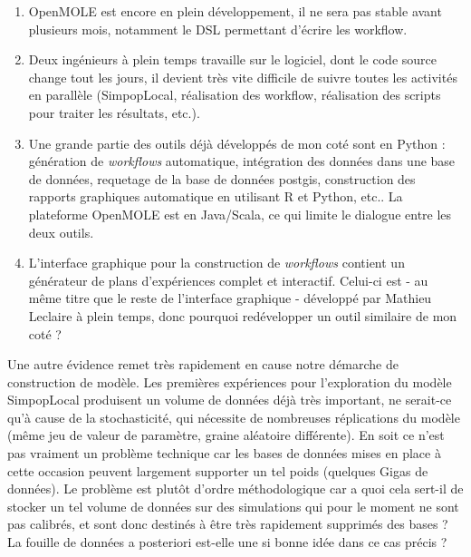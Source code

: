 \begin{enumerate}[label=(\alph*),labelindent=\parindent,leftmargin=*]
\item OpenMOLE est encore en plein développement, il ne sera pas stable avant plusieurs mois, notamment le DSL permettant d'écrire les workflow.
\item Deux ingénieurs à plein temps travaille sur le logiciel, dont le code source change tout les jours, il devient très vite difficile de suivre toutes les activités en parallèle (SimpopLocal, réalisation des workflow, réalisation des scripts pour traiter les résultats, etc.).
\item Une grande partie des outils déjà développés de mon coté sont en Python : génération de \textit{workflows} automatique, intégration des données dans une base de données, requetage de la base de données postgis, construction des rapports graphiques automatique en utilisant R et Python, etc.. La plateforme OpenMOLE est en Java/Scala, ce qui limite le dialogue entre les deux outils.
\item L'interface graphique pour la construction de \textit{workflows} contient un générateur de plans d'expériences complet et interactif. Celui-ci est - au même titre que le reste de l'interface graphique - développé par Mathieu Leclaire à plein temps, donc pourquoi redévelopper un outil similaire de mon coté ?
\end{enumerate}

Une autre évidence remet très rapidement en cause notre démarche de construction de modèle. Les premières expériences pour l'exploration du modèle SimpopLocal produisent un volume de données déjà très important, ne serait-ce qu'à cause de la stochasticité, qui nécessite de nombreuses réplications du modèle (même jeu de valeur de paramètre, graine aléatoire différente). En soit ce n'est pas vraiment un problème technique car les bases de données mises en place à cette occasion peuvent largement supporter un tel poids (quelques Gigas de données). Le problème est plutôt d'ordre méthodologique car a quoi cela sert-il de stocker un tel volume de données sur des simulations qui pour le moment ne sont pas calibrés, et sont donc destinés à être très rapidement supprimés des bases ? La fouille de données a posteriori est-elle une si bonne idée dans ce cas précis ?

